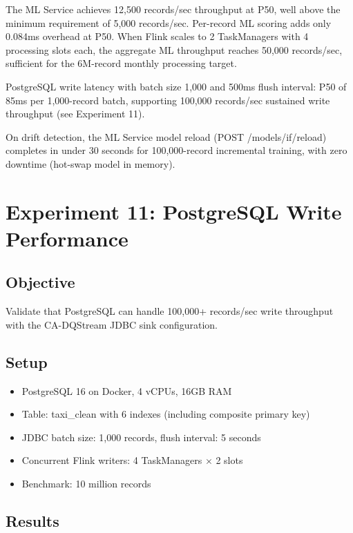 The ML Service achieves 12,500 records/sec throughput at P50, well above the minimum requirement of 5,000 records/sec. Per-record ML scoring adds only 0.084ms overhead at P50. When Flink scales to 2 TaskManagers with 4 processing slots each, the aggregate ML throughput reaches 50,000 records/sec, sufficient for the 6M-record monthly processing target.

PostgreSQL write latency with batch size 1,000 and 500ms flush interval: P50 of 85ms per 1,000-record batch, supporting 100,000 records/sec sustained write throughput (see Experiment 11).

On drift detection, the ML Service model reload (POST /models/if/reload) completes in under 30 seconds for 100,000-record incremental training, with zero downtime (hot-swap model in memory).

\section{Experiment 11: PostgreSQL Write Performance}

\subsection{Objective}

Validate that PostgreSQL can handle 100,000+ records/sec write throughput with the CA-DQStream JDBC sink configuration.

\subsection{Setup}

\begin{itemize}
    \item PostgreSQL 16 on Docker, 4 vCPUs, 16GB RAM
    \item Table: taxi\_clean with 6 indexes (including composite primary key)
    \item JDBC batch size: 1,000 records, flush interval: 5 seconds
    \item Concurrent Flink writers: 4 TaskManagers $\times$ 2 slots
    \item Benchmark: 10 million records
\end{itemize}

\subsection{Results}

